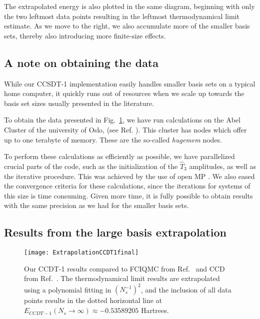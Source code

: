 The extrapolated energy is also plotted in the same diagram, beginning
with only the two leftmost data points resulting in the leftmost
thermodynamical limit estimate. As we move to the right, we also
accumulate more of the smaller basis sets, thereby also introducing
more finite-size effects.

\subsection{A note on obtaining the data}

While our CCSDT-1 implementation easily handles smaller basis sets on
a typical home computer, it quickly runs out of resources when we
scale up towards the basis set sizes usually presented in the
literature.

To obtain the data presented in Fig.~\ref{fig:extrapol}, we have run calculations
on the Abel Cluster of the university of Oslo, (see Ref. \cite{abel}). This cluster has nodes
which  offer up to one terabyte of memory. These are the so-called
\emph{hugemem} nodes.

To perform these calculations as efficiently as possible, we have
parallelized crucial parts of the code, such as the initialization of
the $\hat{T}_3$ amplitudes, as well as the iterative procedure. This
was achieved by the use of open MP \cite{openmp}. We also
eased the convergence criteria for these calculations, since the
iterations for systems of this size is time consuming. Given more time, it
is fully possible to obtain results with the same precision as we had
for the smaller basis sets.






\subsection{Results from the large basis extrapolation}

\begin{figure}[hbtp]
    \centering
    \texttt{[image: ExtrapolationCCDT1final]}
    \caption{Our CCDT-1 results compared to FCIQMC from Ref.~\cite{Shepherd2012} and CCD from Ref.~\cite{Baardsen2015}. The thermodynamical limit results are extrapolated using a polynomial fitting in $(N_s^{-1})^2$, and the inclusion of all data points results in the dotted horizontal line at $E_{CCDT-1}(N_s \rightarrow \infty) \approx -0.53589205$ Hartrees.}
    \label{fig:extrapol}
\end{figure}

